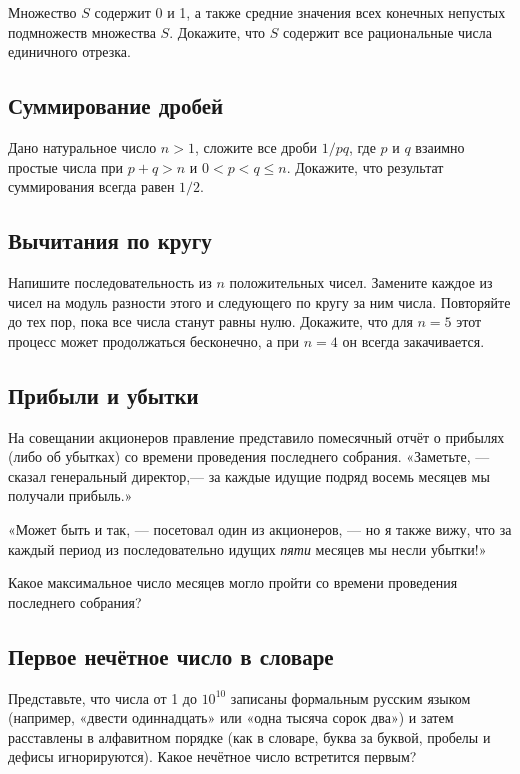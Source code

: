 Множество $S$ содержит 0 и 1, а также средние значения всех конечных непустых подмножеств множества $S$.
Докажите, что $S$ содержит все рациональные числа единичного отрезка.

\subsection*{Суммирование дробей}%

Дано натуральное число $n>1$, 
сложите все дроби $1/pq$, где $p$ и $q$ взаимно простые числа при $p+q>n$ и $0<p<q\le n$.
Докажите, что результат суммирования всегда равен $1/2$.

\subsection*{Вычитания по кругу}

Напишите последовательность из $n$ положительных чисел.
Замените каждое из чисел на модуль разности %
этого и следующего по кругу за ним числа.
Повторяйте до тех пор, пока все числа станут равны нулю.
Докажите, что для $n=5$ этот процесс может продолжаться бесконечно, 
а при $n=4$ он всегда закачивается.

\subsection*{Прибыли и убытки}%

На совещании акционеров правление представило помесячный отчёт о прибылях (либо об убытках) со времени проведения последнего собрания.
«Заметьте, --- сказал генеральный директор,--- за каждые идущие подряд восемь месяцев мы получали прибыль.»

«Может быть и так, --- посетовал один из акционеров, --- но я также вижу, что за каждый период из последовательно идущих \emph{пяти} месяцев мы несли убытки!»

Какое максимальное число месяцев могло пройти со времени проведения последнего собрания?

\subsection*{Первое нечётное число в словаре}%

Представьте, что числа от 1 до $10^{10}$ записаны формальным русским языком (например, «двести одиннадцать» или «одна тысяча сорок два») и затем расставлены в алфавитном порядке (как в словаре, буква за буквой, пробелы и дефисы игнорируются).
Какое нечётное число встретится первым?
